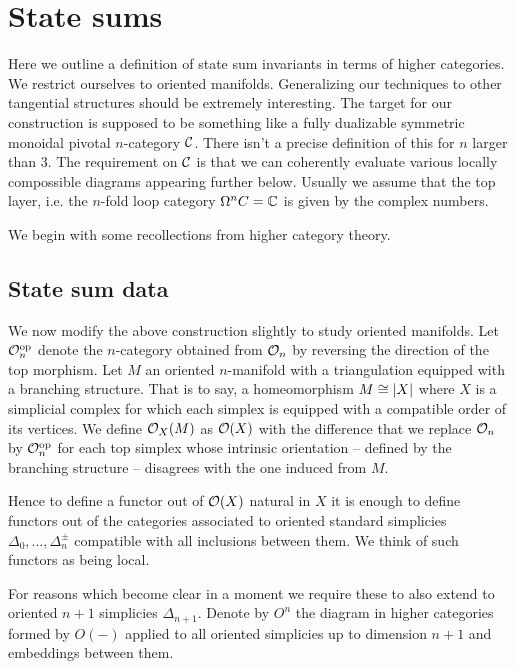 
\section{State sums}

Here we outline a definition of state sum invariants in terms of higher categories.
We restrict ourselves to oriented manifolds.
Generalizing our techniques to other tangential structures should be extremely interesting.
The target for our construction is supposed to be something like a fully dualizable symmetric monoidal pivotal $n$-category $\mathcal{C}$.
There isn't a precise definition of this for $n$ larger than 3. The requirement on $\mathcal{C}$ is that we can coherently evaluate various locally compossible diagrams appearing further below.
Usually we assume that the top layer, i.e.
the $n$-fold loop category $\Omega^n C = \mathbb{C} $ is given by the complex numbers.

We begin with some recollections from higher category theory.

\subsection{State sum data}

We now modify the above construction slightly to study oriented manifolds.
Let $\mathcal{O}_n^{\mathrm{op}}$ denote the $n$-category obtained from $\mathcal{O}_n$ by reversing the direction of the top morphism.
Let $M$ an oriented $n$-manifold with a triangulation equipped with a branching structure.
That is to say, a homeomorphism $M \cong \lvert X\rvert$ where $X$ is a simplicial complex for which each simplex is equipped with a compatible order of its vertices.
We define $\mathcal{O}_X(M)$ as $\mathcal{O}(X)$ with the difference that we replace $\mathcal{O}_n$ by $\mathcal{O}_n^{\mathrm{op}}$ for each top simplex whose intrinsic orientation -- defined by the branching structure -- disagrees with the one induced from $M$.

Hence to define a functor out of $\mathcal{O}(X)$ natural in $X$ it is enough to define functors out of the categories associated to oriented standard simplicies $\Delta_0, \dots, \Delta_n^\pm$ compatible with all inclusions between them.
We think of such functors as being local.

For reasons which become clear in a moment we require these to also extend to oriented $n+1$ simplicies $\Delta_{n+1}$.
Denote by $O^n$ the diagram in higher categories formed by $O(-)$ applied to all oriented simplicies up to dimension $n+1$ and embeddings between them.

